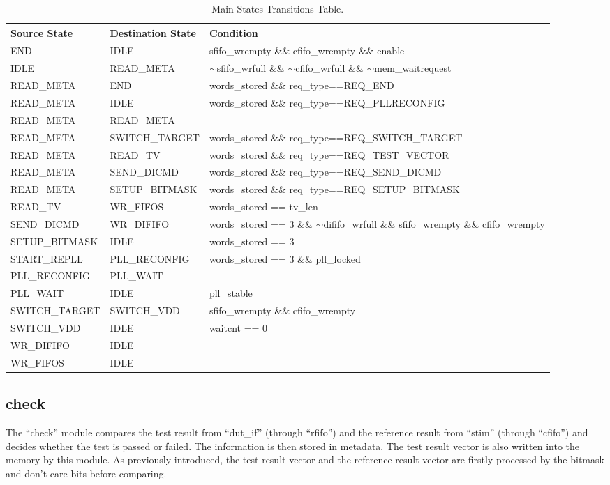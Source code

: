 \begin{table}[ht]
\centering
\begin{tabular}{|l|l|p{}|}
\hline
Source State & Destination State & Condition \\
\hline
END & IDLE & sfifo\_wrempty \&\& cfifo\_wrempty \&\& enable \\
IDLE & READ\_META & $\sim$sfifo\_wrfull \&\& $\sim$cfifo\_wrfull \&\& $\sim$mem\_waitrequest \\
READ\_META & END & words\_stored \&\& req\_type==REQ\_END \\
READ\_META & IDLE & words\_stored \&\& req\_type==REQ\_PLLRECONFIG \\
READ\_META & READ\_META &  \\
READ\_META & SWITCH\_TARGET & words\_stored \&\& req\_type==REQ\_SWITCH\_TARGET \\
READ\_META & READ\_TV & words\_stored \&\& req\_type==REQ\_TEST\_VECTOR \\
READ\_META & SEND\_DICMD & words\_stored \&\& req\_type==REQ\_SEND\_DICMD \\
READ\_META & SETUP\_BITMASK & words\_stored \&\& req\_type==REQ\_SETUP\_BITMASK \\
READ\_TV & WR\_FIFOS & words\_stored == tv\_len \\
SEND\_DICMD & WR\_DIFIFO & words\_stored == 3 \&\& $\sim$dififo\_wrfull \&\& sfifo\_wrempty \&\& cfifo\_wrempty \\
SETUP\_BITMASK & IDLE & words\_stored == 3 \\
START\_REPLL & PLL\_RECONFIG & words\_stored == 3 \&\& pll\_locked \\
PLL\_RECONFIG & PLL\_WAIT &  \\
PLL\_WAIT & IDLE & pll\_stable \\
SWITCH\_TARGET & SWITCH\_VDD & sfifo\_wrempty \&\& cfifo\_wrempty \\
SWITCH\_VDD & IDLE & waitcnt == 0 \\
WR\_DIFIFO & IDLE &  \\
WR\_FIFOS & IDLE &  \\
\hline
\end{tabular}
\caption{Main States Transitions Table.}
\label{tab:states_transitions}
\end{table}

\subsection{check}

The ``check'' module compares the test result from ``dut\_if'' (through ``rfifo'') and the reference result from ``stim'' (through ``cfifo'') and decides whether the test is passed or failed. The information is then stored in metadata. The test result vector is also written into the memory by this module. As previously introduced, the test result vector and the reference result vector are firstly processed by the bitmask and don't-care bits before comparing.





